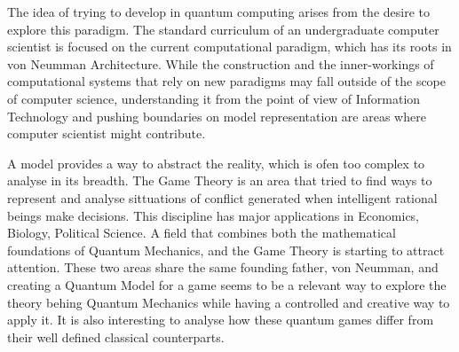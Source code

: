 The idea of trying to develop in quantum computing arises from the desire to explore this paradigm. The standard curriculum of an undergraduate computer scientist is focused on the current computational paradigm, which has its roots in von Neumman Architecture\cite{neumann45edvac}. While the construction and the inner-workings of computational systems that rely on new paradigms may fall outside of the scope of computer science, understanding it from the point of view of Information Technology and pushing boundaries on model representation are areas where computer scientist might contribute.

A model provides a way to abstract the reality, which is ofen too complex to analyse in its breadth. The Game Theory is an area that tried to find ways to represent and analyse sittuations of conflict generated when intelligent rational beings make decisions. This discipline has major applications in Economics, Biology, Political Science. 
A field that combines both the mathematical foundations of Quantum Mechanics, and the Game Theory is starting to attract attention. These two areas share the same founding father, von Neumman, and creating a Quantum Model for a game seems to be a relevant way to explore the theory behing Quantum Mechanics while having a controlled and creative way to apply it. It is also interesting to analyse how these quantum games differ from their well defined classical counterparts.
